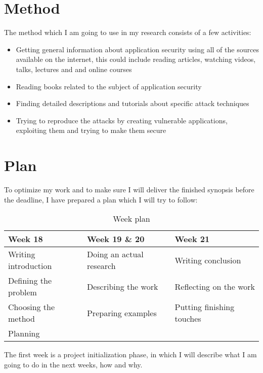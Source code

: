 \documentclass[a4paper]{article}
\begin{document}
\newpage

\section{Method}

The method which I am going to use in my research consists of a few activities:

\begin{itemize}
	\item Getting general information about application security using all
		of the sources available on the internet, this could include
		reading articles, watching videos, talks, lectures and and
		online courses
	\item Reading books related to the subject of application security
	\item Finding detailed descriptions and tutorials about specific attack
		techniques
	\item Trying to reproduce the attacks by creating vulnerable
		applications, exploiting them and trying to make them secure
\end{itemize}

\section{Plan}

To optimize my work and to make sure I will deliver the finished synopsis
before the deadline, I have prepared a plan which I will try to follow:

\begin{table}[h]
	\centering
	\begin{tabular}{@{}lll@{}}
		\toprule
		Week 18              & Week 19 \& 20            & Week 21
		\\ \midrule
		Writing introduction & Doing an actual research & Writing
		conclusion        \\
		Defining the problem & Describing the work      & Reflecting on
		the work    \\
		Choosing the method  & Preparing examples       & Putting
		finishing touches \\
		Planning             &                          &
		\\ \bottomrule
	\end{tabular}
	\caption{Week plan}
	\label{my-label}
\end{table}

The first week is a project initialization phase, in which I will describe what
I am going to do in the next weeks, how and why.
\end{document}
